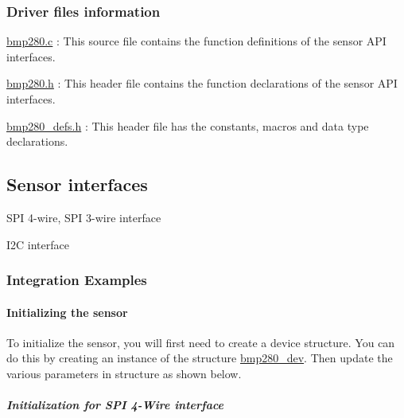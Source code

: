 \subsubsection*{Driver files information\label{_file}%
}


\begin{DoxyItemize}
\item {\ttfamily \mbox{\hyperlink{bmp280_8c}{bmp280.\+c}}} \+: This source file contains the function definitions of the sensor A\+PI interfaces.
\item {\ttfamily \mbox{\hyperlink{bmp280_8h}{bmp280.\+h}}} \+: This header file contains the function declarations of the sensor A\+PI interfaces.
\item {\ttfamily \mbox{\hyperlink{bmp280__defs_8h}{bmp280\+\_\+defs.\+h}}} \+: This header file has the constants, macros and data type declarations.
\end{DoxyItemize}

\subsection*{Sensor interfaces\label{_interface}%
}


\begin{DoxyItemize}
\item S\+PI 4-\/wire, S\+PI 3-\/wire interface
\item I2C interface
\end{DoxyItemize}

\subsubsection*{Integration Examples\label{_examples}%
}

\paragraph*{Initializing the sensor}

To initialize the sensor, you will first need to create a device structure. You can do this by creating an instance of the structure \mbox{\hyperlink{structbmp280__dev}{bmp280\+\_\+dev}}. Then update the various parameters in structure as shown below.

\subparagraph*{Initialization for S\+PI 4-\/\+Wire interface}




